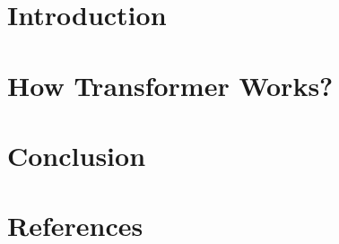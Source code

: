 \section[Intro]{Introduction}


\section[How]{How Transformer Works?}


\section[Cncl]{Conclusion}


\section[Refs]{References}
